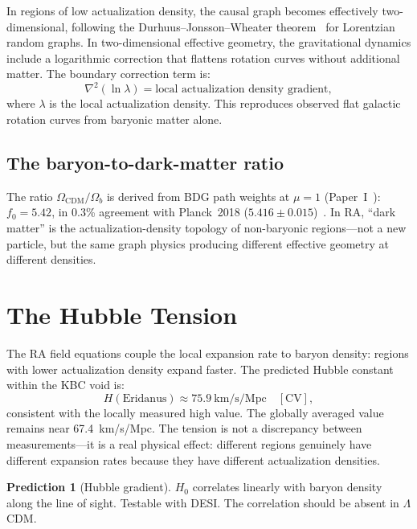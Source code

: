 \documentclass[11pt,a4paper]{article}
\theoremstyle{plain}
\theoremstyle{definition}
\newtheorem{prediction}[theorem]{Prediction}
\theoremstyle{remark}
\begin{document}
In regions of low actualization density, the causal graph becomes effectively
two-dimensional, following the Durhuus--Jonsson--Wheater
theorem~\cite{DJW2010} for Lorentzian random graphs.  In two-dimensional effective
geometry, the gravitational dynamics include a logarithmic correction that flattens
rotation curves without additional matter.  The boundary correction term is:
\begin{equation}
\nabla^2(\ln\lambda) = \text{local actualization density gradient},
\label{eq:rotation}
\end{equation}
where $\lambda$ is the local actualization density.  This reproduces observed flat
galactic rotation curves from baryonic matter alone.

\subsection{The baryon-to-dark-matter ratio}\label{sec:f0}

The ratio $\Omega_{\mathrm{CDM}}/\Omega_b$ is derived from BDG path weights at
$\mu = 1$ (Paper~I~\cite{P1}): $f_0 = 5.42$, in 0.3\% agreement with
Planck~2018 ($5.416 \pm 0.015$)~\cite{Planck2020}.  In RA, ``dark matter'' is the
actualization-density topology of non-baryonic regions---not a new particle, but the
same graph physics producing different effective geometry at different densities.

\section{The Hubble Tension}\label{sec:hubble}

The RA field equations couple the local expansion rate to baryon density: regions
with lower actualization density expand faster.  The predicted Hubble constant
within the KBC void is:
\begin{equation}
H(\text{Eridanus}) \approx 75.9~\text{km/s/Mpc} \quad[\text{CV}],
\label{eq:hubble}
\end{equation}
consistent with the locally measured high value.  The globally averaged value
remains near 67.4~km/s/Mpc.  The tension is not a discrepancy between
measurements---it is a real physical effect: different regions genuinely have
different expansion rates because they have different actualization densities.

\begin{prediction}[Hubble gradient]\label{pred:hubble}
$H_0$ correlates linearly with baryon density along the line of sight.
Testable with DESI.  The correlation should be absent in $\Lambda$CDM.
\end{prediction}
\end{document}
